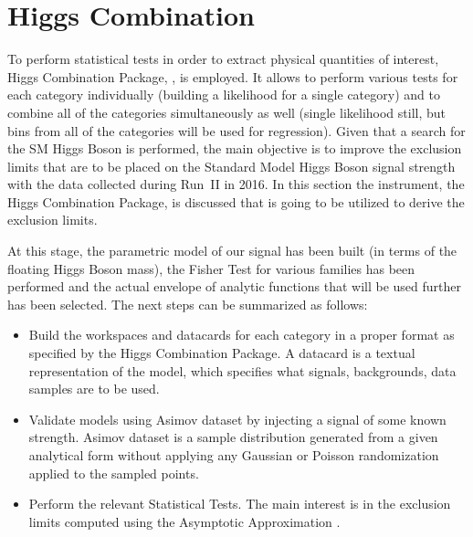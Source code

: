 \section{Higgs Combination} \label{section:higgs_combination}
To perform statistical tests in order to extract physical quantities of interest, Higgs Combination Package, \cite{CMSHiggsCombination}, is employed. It allows to perform various tests for each category individually (building a likelihood for a single category) and to combine all of the categories simultaneously as well (single likelihood still, but bins from all of the categories will be used for regression). Given that a search for the SM Higgs Boson is performed, the main objective is to improve the exclusion limits that are to be placed on the Standard Model Higgs Boson signal strength with the data collected during Run~II in 2016. In this section the instrument, the Higgs Combination Package, is discussed that is going to be utilized to derive the exclusion limits.

At this stage, the parametric model of our signal has been built (in terms of the floating Higgs Boson mass), the Fisher Test for various families has been performed and the actual envelope of analytic functions that will be used further has been selected. The next steps can be summarized as follows:
\begin{itemize}
    \item Build the workspaces and datacards for each category in a proper format as specified by the Higgs Combination Package. A datacard is a textual representation of the model, which specifies what signals, backgrounds, data samples are to be used.
    \item Validate models using Asimov dataset by injecting a signal of some known strength. Asimov dataset is a sample distribution generated from a given analytical form without applying any Gaussian or Poisson randomization applied to the sampled points.
    \item Perform the relevant Statistical Tests. The main interest is in the exclusion limits computed using the Asymptotic Approximation \cite{Asymptotic}.
\end{itemize}

